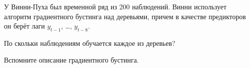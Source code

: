 
\begin{question}
У Винни-Пуха был временной ряд из 200 наблюдений.
Винни использует алгоритм градиентного бустинга над деревьями,
причем в качестве предикторов он берёт лаги \(y_{t-1}\), \ldots, \(y_{t - 8}\).

По скольки наблюдениям обучается каждое из деревьев?
\end{question}

\begin{solution}
Вспомните описание градиентного бустинга.
\end{solution}

